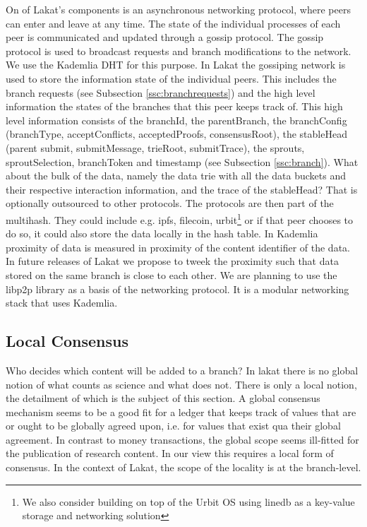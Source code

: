 On of Lakat's components is an asynchronous networking protocol, where peers can enter and leave at any time. The state of the individual processes of each peer is communicated and updated through a gossip protocol. The gossip protocol is used to broadcast requests and branch modifications to the network. We use the Kademlia DHT for this purpose. In Lakat the gossiping network is used to store the information state of the individual peers. This includes the branch requests (see Subsection \ref{ssc:branchrequests}) and the high level information the states of the branches that this peer keeps track of. This high level information consists of the branchId, the parentBranch, the branchConfig (branchType, acceptConflicts, acceptedProofs, consensusRoot), the stableHead (parent submit, submitMessage, trieRoot, submitTrace), the sprouts, sproutSelection, branchToken and timestamp (see Subsection \ref{ssc:branch}). What about the bulk of the data, namely the data trie with all the data buckets and their respective interaction information, and the trace of the stableHead? That is optionally outsourced to other protocols. The protocols are then part of the multihash. They could include e.g. ipfs, filecoin, urbit\footnote{We also consider building on top of the Urbit OS using linedb\cite{linedb} as a key-value storage and networking solution} or if that peer chooses to do so, it could also store the data locally in the hash table. In Kademlia proximity of data is measured in proximity of the content identifier of the data. In future releases of Lakat we propose to tweek the proximity such that data stored on the same branch is close to each other. We are planning to use the libp2p library as a basis of the networking protocol. It is a modular networking stack that uses Kademlia.  


\subsection{Local Consensus}
\label{ssc:localconsensus}

Who decides which content will be added to a branch? In lakat there is no global notion of what counts as science and what does not. There is only a local notion, the detailment of which is the subject of this section. A global consensus mechanism seems to be a good fit for a ledger that keeps track of values that are or ought to be globally agreed upon, i.e. for values that exist qua their global agreement. In contrast to money transactions, the global scope seems ill-fitted for the publication of research content. In our view this requires a local form of consensus. In the context of Lakat, the scope of the locality is at the branch-level. 

